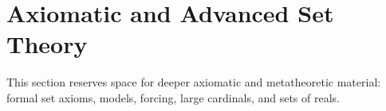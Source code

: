 \section{Axiomatic and Advanced Set Theory}

This section reserves space for deeper axiomatic and metatheoretic material: formal set axioms, models, forcing, large cardinals, and sets of reals.








